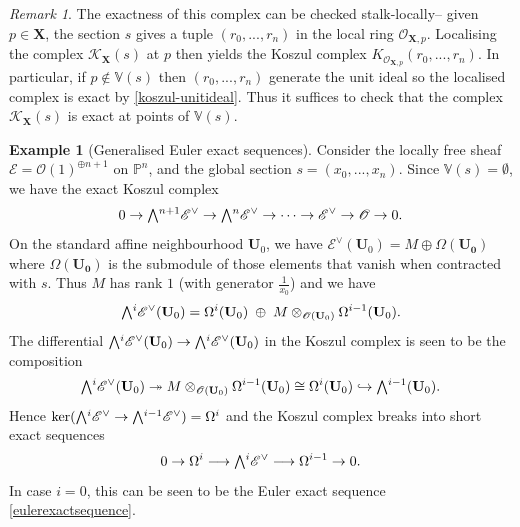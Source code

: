 \documentclass[a4paper]{article}
\theoremstyle{definition}
\newtheorem{example}[defn]{Example}
\theoremstyle{remark}
\newtheorem{remark}[defn]{Remark}
\newcommand{\Exter}{\mathchoice{{\textstyle\bigwedge}}%
    {{\bigwedge}}%
    {{\textstyle\wedge}}%
    {{\scriptstyle\wedge}}}
\newcommand{\Pn}{\ensuremath{{\mathbb{P}^n}}}
\begin{document}
\begin{remark}\label{koszul-exactness-remark}
    The exactness of this complex can be checked stalk-locally-- given
    \(p\in \mathbf{X}\), the section \(s\) gives a tuple \((r_0,...,r_n)\) in
    the local ring \(\mathscr{O}_{\mathbf{X},p}\). Localising the complex
    \(\mathscr{K}_{\mathbf{X}}(s)\) at \(p\) then yields the Koszul complex
    \(K_{\mathscr{O}_{\mathbf{X},p}}(r_0,...,r_n)\). In particular, if \(p\notin
    \mathbb{V}(s)\) then \((r_0,...,r_n)\) generate the unit ideal so the
    localised complex is exact by \cref{koszul-unitideal}. Thus it suffices to
    check that the complex \(\mathscr{K}_{\mathbf{X}}(s)\) is exact at points of
    \(\mathbb{V}(s)\).
\end{remark}

\begin{example}[Generalised Euler exact sequences]\label{geneuler}
    Consider the locally free sheaf \(\mathscr{E}=\mathscr{O}(1)^{\oplus{n+1}}\)
    on \(\Pn\), and the global section \(s=(x_0,...,x_n)\). Since
    \(\mathbb{V}(s)=\emptyset\), we have the exact Koszul complex 
    \[0\rightarrow \Exter^{n+1}\mathscr{E}^\vee \rightarrow
    \Exter^{n}\mathscr{E}^\vee \rightarrow \cdots \rightarrow
    \mathscr{E}^\vee \rightarrow \mathscr{O}\rightarrow 0.\]
    On the standard affine neighbourhood \(\mathbf{U}_0\), we have 
    \(\mathscr{E}^\vee(\mathbf{U}_0)= M\oplus \Omega(\mathbf{U_0})\) where
    \(\Omega(\mathbf{U_0})\) is the submodule of those elements that vanish when
    contracted with \(s\). Thus \(M\) has rank \(1\) (with generator
    \(\frac{1}{x_0}\)) and we have 
    \[\Exter^i\mathscr{E}^\vee(\mathbf{U}_0) = \Omega^i(\mathbf{U}_0)
    \;\oplus \; M\otimes_{\mathscr{O}(\mathbf{U}_0)} \Omega^{i-1}(\mathbf{U}_0).\]
    The differential \(\Exter^i\mathscr{E}^\vee(\mathbf{U}_0)\rightarrow
    \Exter^{i}\mathscr{E}^\vee(\mathbf{U}_0)\) in the Koszul complex is
    seen to be the composition 
    \[\Exter^i\mathscr{E}^\vee(\mathbf{U}_0) \twoheadrightarrow
    M\otimes_{\mathscr{O}(\mathbf{U}_0)}\Omega^{i-1}(\mathbf{U}_0) \cong
    \Omega^i(\mathbf{U}_0)\hookrightarrow \Exter^{i-1}(\mathbf{U}_0).\]
    Hence \(\ker(\Exter^i\mathscr{E}^\vee\rightarrow
    \Exter^{i-1}\mathscr{E}^\vee) = \Omega^i \)
    and the Koszul complex breaks into short exact sequences 
    \begin{equation} 0\rightarrow \Omega^i \longrightarrow \Exter^i\mathscr{E}^\vee
    \longrightarrow \Omega^{i-1}\rightarrow 0.\label{geneulerseq}\end{equation}
    In case \(i=0\), this can be seen to be the Euler exact sequence
    \eqref{eulerexactsequence}.
\end{example}
\end{document}

